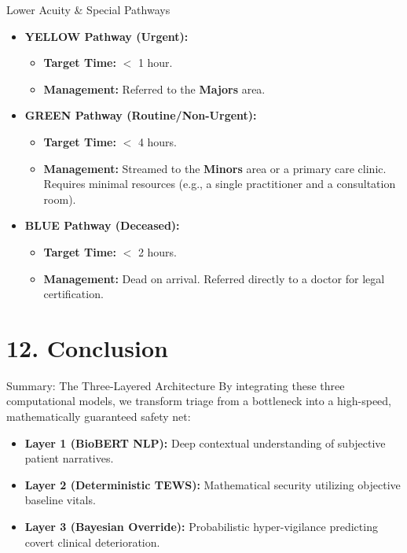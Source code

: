 \documentclass[aspectratio=169]{beamer}
\begin{document}
	\begin{frame}{Lower Acuity \& Special Pathways}
		\begin{itemize}
			\item \textbf{YELLOW Pathway (Urgent):} 
			\begin{itemize}
				\item \textbf{Target Time:} $<$ 1 hour.
				\item \textbf{Management:} Referred to the \textbf{Majors} area.
			\end{itemize}
			\item \textbf{GREEN Pathway (Routine/Non-Urgent):} 
			\begin{itemize}
				\item \textbf{Target Time:} $<$ 4 hours.
				\item \textbf{Management:} Streamed to the \textbf{Minors} area or a primary care clinic. Requires minimal resources (e.g., a single practitioner and a consultation room).
			\end{itemize}
			\item \textbf{BLUE Pathway (Deceased):} 
			\begin{itemize}
				\item \textbf{Target Time:} $<$ 2 hours.
				\item \textbf{Management:} Dead on arrival. Referred directly to a doctor for legal certification.
			\end{itemize}
		\end{itemize}
	\end{frame}
	
	
	
	\section{12. Conclusion}
	
	\begin{frame}{Summary: The Three-Layered Architecture}
		By integrating these three computational models, we transform triage from a bottleneck into a high-speed, mathematically guaranteed safety net:
		\begin{itemize}
			\item \textbf{Layer 1 (BioBERT NLP):} Deep contextual understanding of subjective patient narratives.
			\item \textbf{Layer 2 (Deterministic TEWS):} Mathematical security utilizing objective baseline vitals.
			\item \textbf{Layer 3 (Bayesian Override):} Probabilistic hyper-vigilance predicting covert clinical deterioration.
		\end{itemize}
	\end{frame}
	
\end{document}
